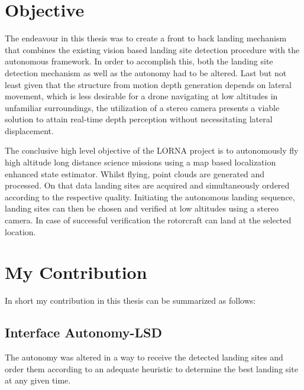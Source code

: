 



\section{Objective}

The endeavour in this thesis was to create a front to back landing mechanism that combines the existing vision based landing site detection procedure with the autonomous framework. In order to accomplish this, both the landing site detection mechanism as well as the autonomy had to be altered. Last but not least given that the structure from motion depth generation depends on lateral movement, which is less desirable for a drone navigating at low altitudes in unfamiliar surroundings, the utilization of a stereo camera presents a viable solution to attain real-time depth perception without necessitating lateral displacement.

The conclusive high level objective of the LORNA project is to autonomously fly high altitude long distance science missions using a map based localization enhanced state estimator. Whilst flying, point clouds are generated and processed. On that data landing sites are acquired and simultaneously ordered according to the respective quality. Initiating the autonomous landing sequence, landing sites can then be chosen and verified at low altitudes using a stereo camera. In case of successful verification the rotorcraft can land at the selected location. 

\section{My Contribution}
In short my contribution in this thesis can be summarized as follows:

\subsection{Interface Autonomy-LSD}
The autonomy was altered in a way to receive the detected landing sites and order them according to an adequate heuristic to determine the best landing site at any given time.
